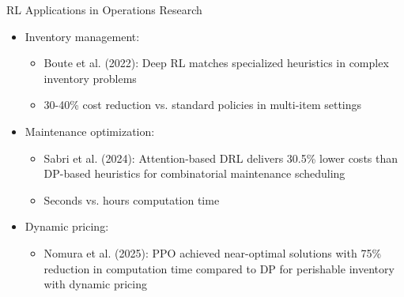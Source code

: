 \documentclass[10pt]{beamer}
\begin{document}
\begin{frame}{RL Applications in Operations Research}
    \begin{itemize}
        \item Inventory management:
        \begin{itemize}
            \item Boute et al. (2022): Deep RL matches specialized heuristics in complex inventory problems
            \item 30-40\% cost reduction vs. standard policies in multi-item settings
        \end{itemize}
        \vspace{0.2cm}
        \item Maintenance optimization:
        \begin{itemize}
            \item Sabri et al. (2024): Attention-based DRL delivers 30.5\% lower costs than DP-based heuristics for combinatorial maintenance scheduling
            \item Seconds vs. hours computation time
        \end{itemize}
        \vspace{0.2cm}
        \item Dynamic pricing:
        \begin{itemize}
            \item Nomura et al. (2025): PPO achieved near-optimal solutions with 75\% reduction in computation time compared to DP for perishable inventory with dynamic pricing
        \end{itemize}
    \end{itemize}
\end{frame}
\end{document}

